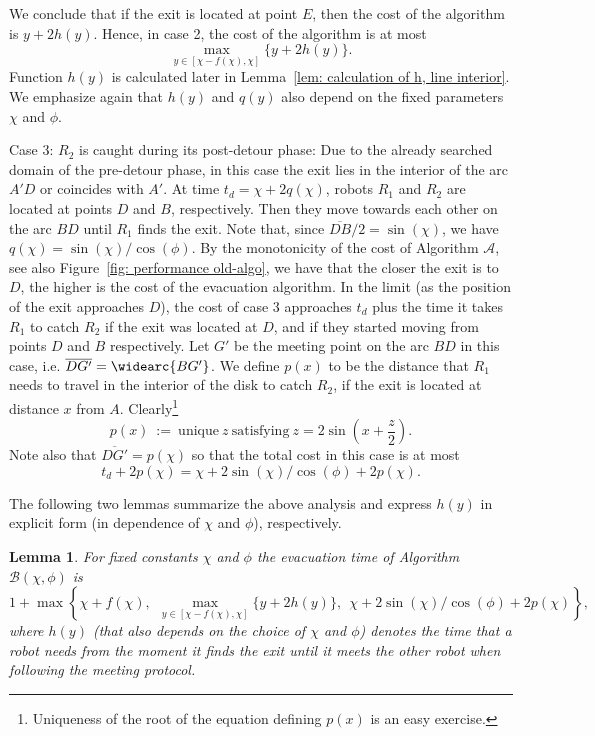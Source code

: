 \documentclass[
final
]{dmtcs-episciences}
\newcommand{\barr}[1]{\overline{#1}}
\newcommand{\sinn}[1]{\sin \left({#1}\right)}
\newcommand{\coss}[1]{\cos \left({#1}\right)}
\newcommand{\RA}{\ensuremath{R_1}}
\newcommand{\RB}{\ensuremath{R_2 }}
\newcommand{\postB}{\ensuremath{t_d}} \newcommand{\postC}{\ensuremath{t_d}} \def\qed{\hfill\rule{2mm}{2mm}}
\newcommand{\arccc}[1]{
\widearc{#1}
}
\newtheorem{lemma}[theorem]{Lemma}
\theoremstyle{definition}
\begin{document}
\begin{description}
We conclude that if the exit is located at point $E$, then the cost of the algorithm is $y+2h(y)$. Hence, in case 2, the cost of the algorithm is at most
$$
\max_{y \in [\chi - f(\chi) , \chi] } \{ y + 2 h(y) \}.
$$
Function $h(y)$ is calculated later in Lemma~\ref{lem: calculation of h, line interior}. 
We emphasize again that $h(y)$ and $q(y)$ also depend on the fixed parameters $\chi$ and $\phi$. 
\item{Case 3: $\RB$ is caught during its post-detour phase:} 
Due to the already searched domain of the pre-detour phase, in this case the exit lies in the interior of the arc $A'D$ or coincides with $A'$. 
At time $\postB=\chi+2q(\chi)$, robots $\RA$ and $\RB$ are located at points $D$ and $B$, respectively. Then they move towards each other on the arc $BD$ until $\RA$ finds the exit. 
Note that, since $\barr{DB}/2 = \sinn{\chi}$, we have $q(\chi)=\sinn{\chi}/\coss{\phi}$. 
By the monotonicity of the cost of Algorithm $\mathcal A$, see also Figure~\ref{fig: performance old-algo}, we have that the closer the exit is to $D$, the  higher is the cost of the evacuation algorithm. In the limit (as the position of the exit approaches $D$), the cost of case 3 approaches $\postB$ plus the time it takes $\RA$ to catch $\RB$ if the exit was located at $D$, and if they started moving from points $D$ and $B$ respectively. Let $G'$ be the meeting point on the arc $BD$ in this case, i.e. $\barr{DG'}=\arccc{BG'}$. 
We define $p(x)$ to be the distance that $\RA$ needs to travel in the interior of the disk to catch $\RB$, if the exit is located at distance $x$ from $A$. Clearly\footnote{Uniqueness of the root of the equation defining $p(x)$ is an easy exercise.} 
\begin{equation}\label{equa: def g}
p(x)~:=~ \textrm{unique}~z~\textrm{satisfying}~ z= 2\sinn{x+\frac z2}.
\end{equation}
Note also that $\barr{DG'} = p(\chi)$ so that the total cost in this case is at most  
$$\postB+2p(\chi) = \chi+2\sinn{\chi}/\coss{\phi} + 2p(\chi).$$
\end{description}

The following two lemmas summarize the above analysis and express $h(y)$ in explicit form (in dependence of $\chi$ and $\phi$), respectively.

\begin{lemma}\label{lem: line algo performance}
	For fixed constants $\chi$ and $\phi$ 
	the evacuation time of Algorithm $\mathcal B(\chi,\phi)$ is 
\begin{equation}\label{eqa: line algo performance}
1+\max
\left\{
\chi+f(\chi),~~
\max_{y \in [\chi - f(\chi) , \chi] } \{ y + 2 h(y) \},~~
\chi+2\sinn{\chi}/\coss{\phi} + 2p(\chi)
\right\},
\end{equation}
where $h(y)$ (that also depends on the choice of $\chi$ and $\phi$) denotes the time that a robot needs from the moment it finds the exit until it meets the other robot when following the meeting protocol.
\end{lemma}
\end{document}
